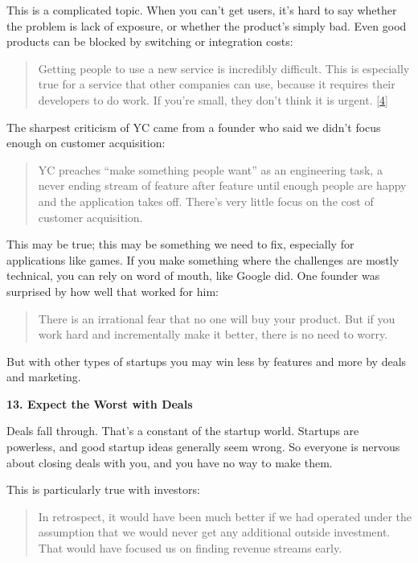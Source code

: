 This is a complicated topic. When you can't get users, it's hard to say
whether the problem is lack of exposure, or whether the product's simply
bad. Even good products can be blocked by switching or integration
costs:

\begin{quote}
Getting people to use a new service is incredibly difficult. This is
especially true for a service that other companies can use, because it
requires their developers to do work. If you're small, they don't think
it is urgent. {[}\hyperref[f4n]{4}{]}
\end{quote}

The sharpest criticism of YC came from a founder who said we didn't
focus enough on customer acquisition:

\begin{quote}
YC preaches ``make something people want'' as an engineering task, a
never ending stream of feature after feature until enough people are
happy and the application takes off. There's very little focus on the
cost of customer acquisition.
\end{quote}

This may be true; this may be something we need to fix, especially for
applications like games. If you make something where the challenges are
mostly technical, you can rely on word of mouth, like Google did. One
founder was surprised by how well that worked for him:

\begin{quote}
There is an irrational fear that no one will buy your product. But if
you work hard and incrementally make it better, there is no need to
worry.
\end{quote}

But with other types of startups you may win less by features and more
by deals and marketing.

\textbf{13. Expect the Worst with Deals}

Deals fall through. That's a constant of the startup world. Startups are
powerless, and good startup ideas generally seem wrong. So everyone is
nervous about closing deals with you, and you have no way to make them.

This is particularly true with investors:

\begin{quote}
In retrospect, it would have been much better if we had operated under
the assumption that we would never get any additional outside
investment. That would have focused us on finding revenue streams early.
\end{quote}

